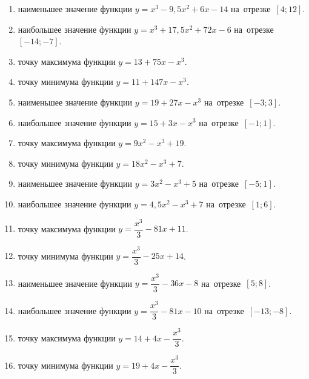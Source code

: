\documentclass[a4paper,10pt]{article}
\begin{document}
\begin{enumerate}
\item {} наименьшее значение функции $y=x^3 -9,5x^2+6x-14$ на~отрезке~$\left[4;12\right]$.

\item {} наибольшее значение функции $y=x^3 +17,5x^2+72x-6$ на~отрезке~$\left[-14;-7\right]$.

\item {} точку максимума функции $y=13+75x-x^3$.

\item {} точку минимума функции $y=11+147x-x^3$.

\item {} наименьшее значение функции $y=19+27x-x^3$ на~отрезке~$\left[-3;3\right]$.

\item {} наибольшее значение функции $y=15+3x-x^3$ на~отрезке~$\left[-1;1\right]$.

\item {} точку максимума функции $y=9x^2-x^3+19$.

\item {} точку минимума функции $y=18x^2-x^3+7$.

\item {} наименьшее значение функции $y=3x^2-x^3+5$ на~отрезке~$\left[-5;1\right]$.

\item {} наибольшее значение функции $y=4,5x^2-x^3+7$ на~отрезке~$\left[1;6\right]$.

\item {} точку максимума функции $y=\dfrac{x^3}{3} -81x+11$.

\item {} точку минимума функции $y=\dfrac{x^3}{3} -25x+14$.

\item {} наименьшее значение функции $y=\dfrac{x^3}{3} -36x-8$ на~отрезке~$\left[5;8\right]$.

\item {} наибольшее значение функции $y=\dfrac{x^3}{3} -81x-10$ на~отрезке~$\left[-13;-8\right]$.

\item {} точку максимума функции $y=14 +4x-\dfrac{x^3}{3}$.

\item {} точку минимума функции $y=19 +4x-\dfrac{x^3}{3}$.


\end{enumerate}
\end{document}
